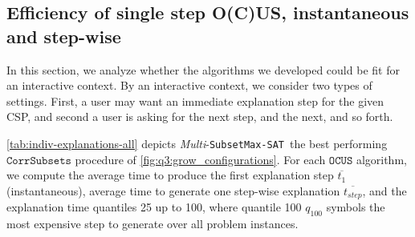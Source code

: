\documentclass[twoside,11pt]{article}
\newcommand\comment[1]{\marginpar{\tiny #1}}
\renewcommand\comment[1]{#1}
\newcommand{\tias}[1]{{\comment{\color{blue}Tias:#1}}}
\newcommand\mm[1]{\ensuremath{#1}\xspace}
\newcommand\call[1]{\mm{\texttt{#1}}}
\newcommand\subsetmaxsat{\texttt{SubsetMax-SAT}}
\newcommand\comus{\mm{\call{OCUS}}}
\newcommand\corrsubsets{\mm{\call{CorrSubsets}}}
\begin{document}

\subsection{Efficiency of single step O(C)US, instantaneous and step-wise}

In this section, we analyze whether the algorithms we developed could be fit for an interactive context. By an interactive context, we consider two types of settings. First, a user may want an immediate explanation step for the given CSP, and second a user is asking for the next step, and the next, and so forth. 

\cref{tab:indiv-explanations-all} depicts \emph{Multi}-\subsetmaxsat~the best performing \corrsubsets procedure of \cref{fig:q3:grow_configurations}. For each \comus algorithm, we compute the average time to produce the first explanation step $\overline{t_{1}}$ (instantaneous), average time to generate one step-wise explanation $\overline{t_{step}}$, and the explanation time quantiles 25 up to 100, where quantile 100 $q_{100}$ symbols the most expensive step to generate over all problem instances.
\end{document}
